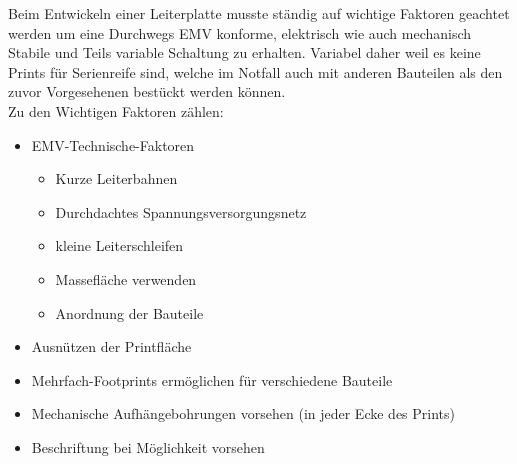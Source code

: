 Beim Entwickeln einer Leiterplatte musste ständig auf wichtige Faktoren geachtet werden um eine Durchwegs EMV konforme, elektrisch wie auch mechanisch Stabile und Teils variable Schaltung zu erhalten.
Variabel daher weil es keine Prints für Serienreife sind, welche im Notfall auch mit anderen Bauteilen als den zuvor Vorgesehenen bestückt werden können.\\
Zu den Wichtigen Faktoren zählen:
\begin{itemize}
	\item EMV-Technische-Faktoren
	\begin{itemize}
		\item Kurze Leiterbahnen
		\item Durchdachtes Spannungsversorgungsnetz
		\item kleine Leiterschleifen
		\item Massefläche verwenden
		\item Anordnung der Bauteile
	\end{itemize}
	\item Ausnützen der Printfläche
	\item Mehrfach-Footprints ermöglichen für verschiedene Bauteile
	\item Mechanische Aufhängebohrungen vorsehen (in jeder Ecke des Prints)
	\item Beschriftung bei Möglichkeit vorsehen
\end{itemize}


